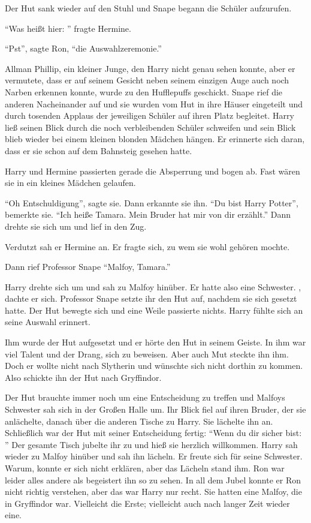 Der Hut sank wieder auf den Stuhl und Snape begann die Schüler aufzurufen.

\enquote{Was heißt hier: } fragte Hermine.

\enquote{Pst}, sagte Ron, \enquote{die Auswahlzeremonie.}

Allman Phillip, ein kleiner Junge, den Harry nicht genau sehen konnte, aber er vermutete, dass er auf seinem Gesicht neben seinem einzigen Auge auch noch Narben erkennen konnte, wurde zu den Hufflepuffs geschickt. Snape rief die anderen Nacheinander auf und sie wurden vom Hut in ihre Häuser eingeteilt und durch tosenden Applaus der jeweiligen Schüler auf ihren Platz begleitet. Harry ließ seinen Blick durch die noch verbleibenden Schüler schweifen und sein Blick blieb wieder bei einem kleinen blonden Mädchen hängen. Er erinnerte sich daran, dass er sie schon auf dem Bahnsteig gesehen hatte.

\begin{rueckblick}
Harry und Hermine passierten gerade die Absperrung und bogen ab. Fast wären sie in ein kleines Mädchen gelaufen.

\enquote{Oh Entschuldigung}, sagte sie. Dann erkannte sie ihn. \enquote{Du bist Harry Potter}, bemerkte sie. \enquote{Ich heiße Tamara. Mein Bruder hat mir von dir erzählt.} Dann drehte sie sich um und lief in den Zug.

Verdutzt sah er Hermine an. Er fragte sich, zu wem sie wohl gehören mochte.
\end{rueckblick}

Dann rief Professor Snape \enquote{Malfoy, Tamara.}

Harry drehte sich um und sah zu Malfoy hinüber. Er hatte also eine Schwester. , dachte er sich. Professor Snape setzte ihr den Hut auf, nachdem sie sich gesetzt hatte. Der Hut bewegte sich und eine Weile passierte nichts. Harry fühlte sich an seine Auswahl erinnert.

\begin{rueckblick}
Ihm wurde der Hut aufgesetzt und er hörte den Hut in seinem Geiste. In ihm war viel Talent und der Drang, sich zu beweisen. Aber auch Mut steckte ihn ihm. Doch er wollte nicht nach Slytherin und wünschte sich nicht dorthin zu kommen. Also schickte ihn der Hut nach Gryffindor.
\end{rueckblick}

Der Hut brauchte immer noch um eine Entscheidung zu treffen und Malfoys Schwester sah sich in der Großen Halle um. Ihr Blick fiel auf ihren Bruder, der sie anlächelte, danach über die anderen Tische zu Harry. Sie lächelte ihn an. Schließlich war der Hut mit seiner Entscheidung fertig: \enquote{Wenn du dir sicher bist: } Der gesamte Tisch jubelte ihr zu und hieß sie herzlich willkommen. Harry sah wieder zu Malfoy hinüber und sah ihn lächeln. Er freute sich für seine Schwester. Warum, konnte er sich nicht erklären, aber das Lächeln stand ihm. Ron war leider alles andere als begeistert ihn so zu sehen. In all dem Jubel konnte er Ron nicht richtig verstehen, aber das war Harry nur recht. Sie hatten eine Malfoy, die in Gryffindor war. Vielleicht die Erste; vielleicht auch nach langer Zeit wieder eine. 

